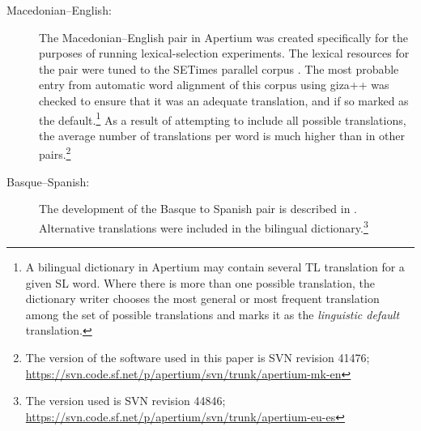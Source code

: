 \documentclass[11pt]{article}
\newcommand{\comment}[1]{\todo{#1}}
\begin{document}
\begin{description}
\item[Macedonian--English:] The Macedonian--English pair
  in Apertium was created specifically for the purposes of running
  lexical-selection experiments. 
  The lexical resources for the pair were tuned to the SETimes
  parallel corpus \citep{tyers10}.
  The most probable entry from automatic word alignment of this corpus
  using {\sc giza++} \citep{och03a} was checked to ensure that it was
  an adequate translation, and if so marked as the default.\footnote{A
    bilingual dictionary in Apertium \citep{forcada2011apertium} may
    contain several TL translation for a given SL word. Where there is
    more than one possible translation, the dictionary writer chooses
    the most general or most frequent translation among the set of
    possible translations and marks it as the \emph{linguistic
      default} translation.} As a result of attempting to include all
  possible translations, the average number of translations per word
  is much higher %
  than in other pairs.\footnote{The version of the software used in this paper is SVN revision
  41476; \url{https://svn.code.sf.net/p/apertium/svn/trunk/apertium-mk-en}}
\item[Basque--Spanish:] The development of the Basque to Spanish pair
  is described in \cite{ginesti09}. 
  Alternative translations were included in the bilingual
  dictionary.\footnote{The version used is SVN revision 44846; \url{https://svn.code.sf.net/p/apertium/svn/trunk/apertium-eu-es}}


\end{description}
\end{document}
